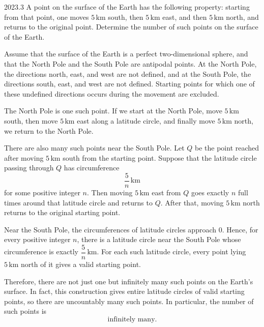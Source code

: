     \begin{pastproblem}{2023.3}
        A point on the surface of the Earth has the following property: starting from that point,
        one moves $5\,\mathrm{km}$ south, then $5\,\mathrm{km}$ east, and then $5\,\mathrm{km}$ north, and
        returns to the original point. Determine the number of such points on the surface of the
        Earth.

        Assume that the surface of the Earth is a perfect two-dimensional sphere, and that the North
        Pole and the South Pole are antipodal points. At the North Pole, the directions north, east,
        and west are not defined, and at the South Pole, the directions south, east, and west are
        not defined. Starting points for which one of these undefined directions occurs during the
        movement are excluded.
    \end{pastproblem}

    \begin{solution}
        The North Pole is one such point. If we start at the North Pole, move $5\,\mathrm{km}$ south,
        then move $5\,\mathrm{km}$ east along a latitude circle, and finally move $5\,\mathrm{km}$
        north, we return to the North Pole.

        There are also many such points near the South Pole. Let $Q$ be the point reached after
        moving $5\,\mathrm{km}$ south from the starting point. Suppose that the latitude circle
        passing through $Q$ has circumference
        \[
            \frac{5}{n}\,\mathrm{km}
        \]
        for some positive integer $n$. Then moving $5\,\mathrm{km}$ east from $Q$ goes exactly $n$
        full times around that latitude circle and returns to $Q$. After that, moving $5\,\mathrm{km}$
        north returns to the original starting point.

        Near the South Pole, the circumferences of latitude circles approach $0$. Hence, for every
        positive integer $n$, there is a latitude circle near the South Pole whose circumference is
        exactly $\dfrac{5}{n}\,\mathrm{km}$. For each such latitude circle, every point lying
        $5\,\mathrm{km}$ north of it gives a valid starting point.

        Therefore, there are not just one but infinitely many such points on the Earth's surface. In
        fact, this construction gives entire latitude circles of valid starting points, so there are
        uncountably many such points. In particular, the number of such points is
        \[
            \boxed{\text{infinitely many}}.
        \]
    \end{solution}

